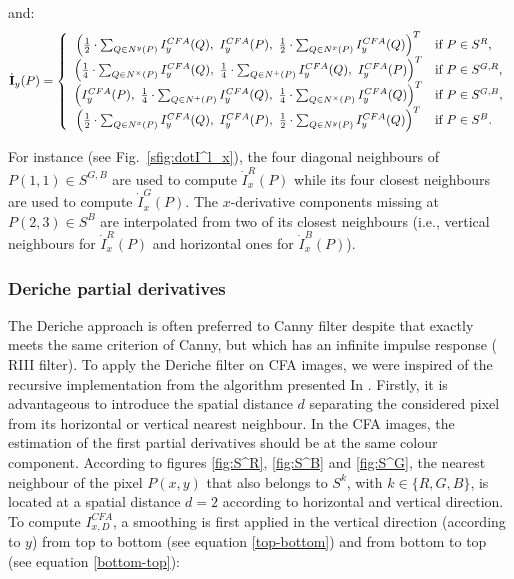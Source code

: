 \documentclass[twoside]{article}
\begin{document}
\noindent and:
\begin{equation}
	\dot{\textbf{I}}_y(P) = \left\lbrace
	\begin{array}{cl}
		\left( \frac{1}{2}\cdot\sum_{Q \in N^{y}(P)} I^{CFA}_y(Q),~I^{CFA}_y(P),~\frac{1}{2}\cdot\sum_{Q \in N^{x}(P)} I^{CFA}_y(Q) \right)^T & \text{if $P \in S^R$,} \\
		\left( \frac{1}{4}\cdot\sum_{Q \in N^{\times}(P)} I^{CFA}_y(Q),~\frac{1}{4}\cdot\sum_{Q \in N^{+}(P)} I^{CFA}_y(Q),~I^{CFA}_y(P) \right)^T & \text{if $P \in S^{G,R}$,}\\
		\left( I^{CFA}_y(P),~\frac{1}{4}\cdot\sum_{Q \in N^{+}(P)} I^{CFA}_y(Q),~\frac{1}{4}\cdot\sum_{Q \in N^{\times}(P)} I^{CFA}_y(Q) \right)^T & \text{if $P \in S^{G,B}$,}\\
		\left( \frac{1}{2}\cdot\sum_{Q \in N^{x}(P)} I^{CFA}_y(Q),~I^{CFA}_y(P),~\frac{1}{2}\cdot\sum_{Q \in N^{y}(P)} I^{CFA}_y(Q) \right)^T & \text{if $P \in S^B$.}
	\end{array}\right.
	\label{eq:I_p_y_full}
\end{equation}

\noindent For instance (see Fig.~\ref{sfig:dotI^l_x}), the four diagonal neighbours of $P(1,1) \in S^{G,B}$ are used to compute $\dot{I}^R_x(P)$ while its four closest neighbours are used to compute $\dot{I}^G_x(P)$. The $x$-derivative components missing at $P(2,3) \in S^B$  are interpolated from two of its closest neighbours (i.e., vertical neighbours for $\dot{I}^R_x(P)$ and horizontal ones for $\dot{I}^B_x(P)$).


\subsubsection{Deriche partial derivatives}
\label{Deriche partial derivatives}



The Deriche approach \cite{deriche_ijcv_1987} is often preferred to Canny filter \cite{canny_ieeetpami_1986} despite that exactly meets the same criterion of Canny, but which has an infinite impulse response ( RIII filter).
To apply the Deriche filter on CFA images, we were inspired of the recursive implementation from the algorithm presented In \cite{deriche_ieeetpami_1990}. 
Firstly, it is advantageous to introduce the spatial distance $d$ separating the considered pixel from its horizontal or vertical nearest neighbour. 
In the CFA images, the estimation of the first partial derivatives should be at the same colour component. According to figures \ref{fig:S^R}, \ref{fig:S^B} and \ref{fig:S^G}, the nearest neighbour of the pixel $P(x,y)$ that also belongs to $S^k$, with $k\in\{R,G,B\}$, is located at a spatial distance $d=2$ according to horizontal and vertical direction. To compute $I^{CFA}_{x,D}$, a smoothing is first applied in the vertical direction (according to $y$) from top to bottom (see equation \eqref{top-bottom}) and from bottom to top (see equation \eqref{bottom-top}):
\end{document}
